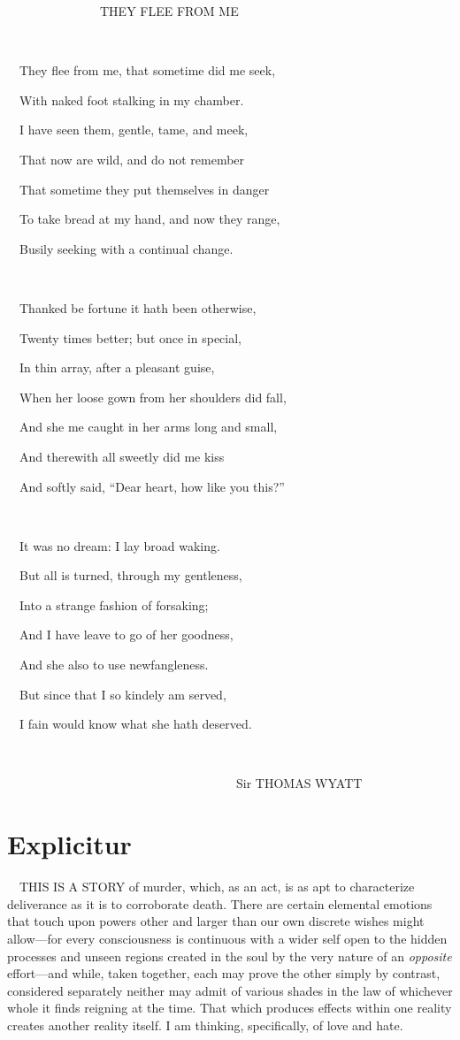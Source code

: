 \clearpage
~~~~~~~~~~~~~~~THEY FLEE FROM ME

~

~~They flee from me, that sometime did me seek,

~~With naked foot stalking in my chamber.

~~I have seen them, gentle, tame, and meek,

~~That now are wild, and do not remember

~~That sometime they put themselves in danger

~~To take bread at my hand, and now they range,

~~Busily seeking with a continual change.

~

~~Thanked be fortune it hath been otherwise,

~~Twenty times better; but once in special,

~~In thin array, after a pleasant guise,

~~When her loose gown from her shoulders did fall,

~~And she me caught in her arms long and small,

~~And therewith all sweetly did me kiss

~~And softly said, ``Dear heart, how like you this?''

~

~~It was no dream: I lay broad waking.

~~But all is turned, through my gentleness,

~~Into a strange fashion of forsaking;

~~And I have leave to go of her goodness,

~~And she also to use newfangleness.

~~But since that I so kindely am served,

~~I fain would know what she hath deserved.

~

~~~~~~~~~~~~~~~~~~~~~~~~~~~~~~~~~~~~~Sir THOMAS WYATT



\chapter*{Explicitur}

~~THIS IS A STORY of murder, which, as an act, is as apt to characterize
deliverance as it is to corroborate death. There are certain elemental
emotions that touch upon powers other and larger than our own discrete
wishes might allow---for every consciousness is continuous with a wider
self open to the hidden processes and unseen regions created in the soul
by the very nature of an \emph{opposite} effort---and while, taken
together, each may prove the other simply by contrast, considered
separately neither may admit of various shades in the law of whichever
whole it finds reigning at the time. That which produces effects within
one reality creates another reality itself. I am thinking, specifically,
of love and hate.

